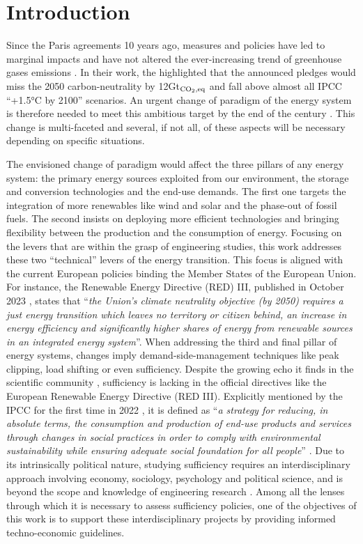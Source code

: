 \documentclass[11pt,twoside,a4paper,english]{article}
\def\ie{i.e.,}
\begin{document}
\section{Introduction}
\label{sec:intro}
Since the Paris agreements 10 years ago, measures and policies have led to marginal impacts and have not altered the ever-increasing trend of greenhouse gases emissions \cite{ourwold_CO2}.  In their work, the \citet{IEA_APS} highlighted that the announced pledges would miss the 2050 carbon-neutrality by 12Gt$_{\ce{CO2},\text{eq}}$ and fall above almost all IPCC ``+1.5$°$C by 2100'' scenarios. An urgent change of paradigm of the energy system is therefore needed to meet this ambitious target by the end of the century \cite{iea_2019}. This change is multi-faceted and several, if not all, of these aspects will be necessary depending on specific situations. 

The envisioned change of paradigm would affect the three pillars of any energy system: the primary energy sources exploited from our environment, the storage and conversion technologies and the end-use demands. The first one targets the integration of more renewables like wind and solar and the phase-out of fossil fuels. The second insists on deploying more efficient technologies and bringing flexibility between the production and the consumption of energy. Focusing on the levers that are within the grasp of engineering studies, this work addresses these two ``technical'' levers of the energy transition. This focus is aligned with the current European policies binding the Member States of the European Union. For instance, the Renewable Energy Directive (RED) III, published in October 2023 \cite{REDIII}, states that ``\emph{the Union’s climate neutrality objective (by 2050) requires a just energy transition which leaves no territory or citizen behind, an increase in energy efficiency and significantly higher shares of energy from renewable sources in an integrated energy system}''.%
When addressing the third and final pillar of energy systems, changes imply demand-side-management techniques like peak clipping, load shifting \cite{bakare2023comprehensive} or even sufficiency. Despite the growing echo it finds in the scientific community \cite{o2018good}, sufficiency is lacking in the official directives like the European Renewable Energy Directive (RED III). Explicitly mentioned by the IPCC for the first time in 2022 \cite{IPCC2022}, it is defined as ``\emph{a strategy for reducing, in absolute terms, the consumption and production of end-use products and services through changes in social practices in order to comply with environmental sustainability while ensuring adequate social foundation for all people}'' \cite{lage2023citizens}. Due to its intrinsically political nature, studying sufficiency requires an interdisciplinary approach involving economy, sociology, psychology and political science, and is beyond the scope and knowledge of engineering research \cite{schmidt2015interdisciplinary}. Among all the lenses through which it is necessary to assess sufficiency policies, one of the objectives of this work is to support these interdisciplinary projects by providing informed techno-economic guidelines.
\end{document}
